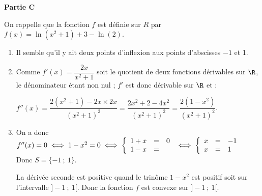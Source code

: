 \bigskip

\textbf{Partie C}

\medskip

On rappelle que la fonction $f$ est définie sur $R$ par $f(x) = \ln \left(x^2 + 1\right) + 3 - \ln (2)$.

\medskip

\begin{enumerate}
\item %
Il semble qu'il y ait deux points d'inflexion aux points d'abscisses $- 1$ et 1.
\item %
Comme $f'(x) = \dfrac{2x}{x^2 + 1}$ soit le quotient de deux fonctions dérivables sur $\R$, le dénominateur étant non nul ; $f'$ est donc dérivable sur $\R$ et :

$f''(x) = \dfrac{2\left(x^2 + 1\right) - 2x \times 2x}{\left(x^2 + 1\right)^2} = \dfrac{2x^2 + 2 - 4x^2}{\left(x^2 + 1\right)^2} = \dfrac{2\left(1 - x^2\right)}{\left(x^2 + 1\right)^2}$.
\item %
On a donc $f''(x) = 0 \iff 1 - x^2 = 0 \iff \left\{\begin{array}{l c  l}
1 +x&=&0\\
1 - x&=&
\end{array}\right.\iff \left\{\begin{array}{l c l}
x&=&- 1\\
x&=&1
\end{array}\right.$ Donc $S = \{-1~;~1\}$.

La dérivée seconde est positive quand le trinôme $1 - x^2$ est positif soit sur l'intervalle $]-1~;~1[$. Donc la fonction $f$ est convexe sur $]-1~;~1[$.
\end{enumerate}

